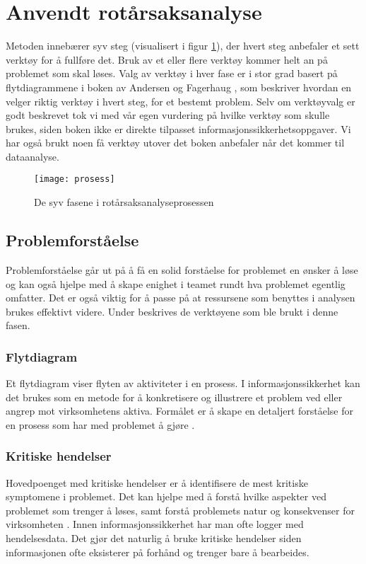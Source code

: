 \section{Anvendt rotårsaksanalyse}
Metoden innebærer syv steg (visualisert i figur \ref{fig:prosess}), der hvert steg anbefaler et sett verktøy for å fullføre det. Bruk av et eller flere verktøy kommer helt an på problemet som skal løses. Valg av verktøy i hver fase er i stor grad basert på flytdiagrammene i boken av Andersen og Fagerhaug \cite{RCA}, som beskriver hvordan en velger riktig verktøy i hvert steg, for et bestemt problem. Selv om verktøyvalg er godt beskrevet tok vi med vår egen vurdering på hvilke verktøy som skulle brukes, siden boken ikke er direkte tilpasset informasjonssikkerhetsoppgaver. Vi har også brukt noen få verktøy utover det boken anbefaler når det kommer til dataanalyse. 

\begin{figure}[H]
    \centering
    \texttt{[image: prosess]}
    \caption[RCA-prosess]{De syv fasene i rotårsaksanalyseprosessen}
    \label{fig:prosess}
\end{figure}

\subsection{Problemforståelse}
Problemforståelse går ut på å få en solid forståelse for problemet en ønsker å løse og kan også hjelpe med å skape enighet i teamet rundt hva problemet egentlig omfatter. Det er også viktig for å passe på at ressursene som benyttes i analysen brukes effektivt videre. Under beskrives de verktøyene som ble brukt i denne fasen. 

\subsubsection{Flytdiagram}
Et flytdiagram viser flyten av aktiviteter i en prosess. I informasjonssikkerhet kan det brukes som en metode for å konkretisere og illustrere et problem ved eller angrep mot virksomhetens aktiva. Formålet er å skape en detaljert forståelse for en prosess som har med problemet å gjøre \cite{RCA}.

\subsubsection{Kritiske hendelser}
Hovedpoenget med kritiske hendelser er å identifisere de mest kritiske symptomene i problemet. Det kan hjelpe med å forstå hvilke aspekter ved problemet som trenger å løses, samt forstå problemets natur og konsekvenser for virksomheten \cite{RCA}. Innen informasjonssikkerhet har man ofte logger med hendelsesdata. Det gjør det naturlig å bruke kritiske hendelser siden informasjonen ofte eksisterer på forhånd og trenger bare å bearbeides. 

